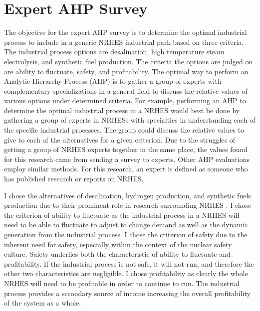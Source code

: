 \documentclass[12pt]{UIdahoMastersThesis}
\begin{document}
\section{Expert AHP Survey}
The objective for the expert AHP survey is to determine the optimal industrial process to include in a generic NRHES industrial park based on three criteria. The industrial process options are desalination, high temperature steam electrolysis, and synthetic fuel production. The criteria the options are judged on are ability to fluctuate, safety, and profitability. The optimal way to perform an Analytic Hierarchy Process (AHP) is to gather a group of experts with complementary specializations in a general field to discuss the relative values of various options under determined criteria. For example, performing an AHP to determine the optimal industrial process in a NRHES would best be done by gathering a group of experts in NRHESs with specialties in understanding each of the specific industrial processes. The group could discuss the relative values to give to each of the alternatives for a given criterion. Due to the struggles of getting a group of NRHES experts together in the same place, the values found for this research came from sending a survey to experts.  Other AHP evaluations employ similar methods\cite{Pan2008}. For this research, an expert is defined as someone who has published research or reports on NRHES.

	I chose the alternatives of desalination, hydrogen production, and synthetic fuels production due to their prominent role in research surrounding NRHES \cite{Bragg-Sitton2014,Locatelli2015,Kim2016,Bragg-Sitton2016,Garcia2016,Shropshire2011, Ruth2014,Bienvenu2015}.  I chose the criterion of ability to fluctuate as the industrial process in a NRHES will need to be able to fluctuate to adjust to change demand as well as the dynamic generation from the industrial process.  I chose the criterion of safety due to the inherent need for safety, especially within the context of the nuclear safety culture.  Safety underlies both the characteristic of ability to fluctuate and profitability. If the industrial process is not safe, it will not run, and therefore the other two characteristics are negligible. I chose profitability as clearly the whole NRHES will need to be profitable in order to continue to run.  The industrial process provides a secondary source of income  increasing the overall profitability of the system as a whole.
\end{document}
